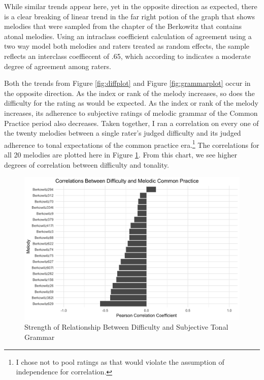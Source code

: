 \documentclass[]{book}
\let\rmarkdownfootnote\footnote%
\def\footnote{\protect\rmarkdownfootnote}
\begin{document}
While similar trends appear here, yet in the opposite direction as expected, there is a clear breaking of linear trend in the far right potion of the graph that shows melodies that were sampled from the chapter of the Berkowitz that contains atonal melodies.
Using an intraclass coefficient calculation of agreement using a two way model both melodies and raters treated as random effects, the sample reflects an interclass coeffiecent of .65, which according to \citet{kooGuidelineSelectingReporting2016} indicates a moderate degree of agreement among raters.

Both the trends from Figure \ref{fig:diffplot} and Figure \ref{fig:grammarplot} occur in the opposite direction.
As the index or rank of the melody increases, so does the difficulty for the rating as would be expected.
As the index or rank of the melody increases, its adherence to subjective ratings of melodic grammar of the Common Practice period also decreases.
Taken together, I ran a correlation on every one of the twenty melodies between a single rater's judged difficulty and its judged adherence to tonal expectations of the common practice era.\footnote{I chose not to pool ratings as that would violate the assumption of independence for correlation.}
The correlations for all 20 melodies are plotted here in Figure \ref{fig:gramcor}.
From this chart, we see higher degrees of correlation between difficulty and tonality.

\begin{figure}

{\centering \includegraphics[width=1\linewidth]{img/grammar_difficulty_correlation_plot} 

}

\caption{Strength of Relationship Between Difficulty and Subjective Tonal Grammar}\label{fig:gramcor}
\end{figure}
\end{document}

